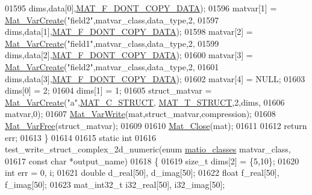 \begin{DoxyCode}
{{{{{01595                    dims,data[0],\hyperlink{group___m_a_t_ggab9d6ef9e3ddca78a317b173f01d53fbba762244499f52eb35e7b53fb79a1f2889}{MAT\_F\_DONT\_COPY\_DATA});
01596     matvar[1] = \hyperlink{group___m_a_t_ga1c54a84bb4d810c6fccdb8869489eac4}{Mat\_VarCreate}(\textcolor{stringliteral}{"field2"},matvar\_class,data\_type,2,
01597                    dims,data[1],\hyperlink{group___m_a_t_ggab9d6ef9e3ddca78a317b173f01d53fbba762244499f52eb35e7b53fb79a1f2889}{MAT\_F\_DONT\_COPY\_DATA});
01598     matvar[2] = \hyperlink{group___m_a_t_ga1c54a84bb4d810c6fccdb8869489eac4}{Mat\_VarCreate}(\textcolor{stringliteral}{"field1"},matvar\_class,data\_type,2,
01599                    dims,data[2],\hyperlink{group___m_a_t_ggab9d6ef9e3ddca78a317b173f01d53fbba762244499f52eb35e7b53fb79a1f2889}{MAT\_F\_DONT\_COPY\_DATA});
01600     matvar[3] = \hyperlink{group___m_a_t_ga1c54a84bb4d810c6fccdb8869489eac4}{Mat\_VarCreate}(\textcolor{stringliteral}{"field2"},matvar\_class,data\_type,2,
01601                    dims,data[3],\hyperlink{group___m_a_t_ggab9d6ef9e3ddca78a317b173f01d53fbba762244499f52eb35e7b53fb79a1f2889}{MAT\_F\_DONT\_COPY\_DATA});
01602     matvar[4] = NULL;
01603     dims[0] = 2;
01604     dims[1] = 1;
01605     struct\_matvar = \hyperlink{group___m_a_t_ga1c54a84bb4d810c6fccdb8869489eac4}{Mat\_VarCreate}(\textcolor{stringliteral}{"a"},\hyperlink{group___m_a_t_ggad4d60ae7b709fc81bfd744fb4c857c40acb467c7749c80902b798134c729bb521}{MAT\_C\_STRUCT},
      \hyperlink{group___m_a_t_ggacf7b3b879282b7ab3a51190e49bf3453a4f4d5a6e1d42c6aa81ffb810e5da5c85}{MAT\_T\_STRUCT},2,dims,
01606                                   matvar,0);
01607     \hyperlink{group___m_a_t_ga4bd3eba12df415d8226e27c457fbbb0b}{Mat\_VarWrite}(mat,struct\_matvar,compression);
01608     \hyperlink{group___m_a_t_ga1d14716f7450530fd1c9d02413787f0e}{Mat\_VarFree}(struct\_matvar);
01609 
01610     \hyperlink{group___m_a_t_ga101c92ff7bde4a2d4615661beba09262}{Mat\_Close}(mat);
01611 
01612     \textcolor{keywordflow}{return} err;
01613 \}
01614 
01615 \textcolor{keyword}{static} \textcolor{keywordtype}{int}
01616 test\_write\_struct\_complex\_2d\_numeric(\textcolor{keyword}{enum} \hyperlink{group___m_a_t_gad4d60ae7b709fc81bfd744fb4c857c40}{matio\_classes} matvar\_class,
01617     \textcolor{keyword}{const} \textcolor{keywordtype}{char} *output\_name)
01618 \{
01619     \textcolor{keywordtype}{size\_t} dims[2] = \{5,10\};
01620     \textcolor{keywordtype}{int}    err = 0, i;
01621     \textcolor{keywordtype}{double}    d\_real[50], d\_imag[50];
01622     \textcolor{keywordtype}{float}     f\_real[50], f\_imag[50];
01623     mat\_int32\_t   i32\_real[50], i32\_imag[50];
}}}}}
\end{DoxyCode}
